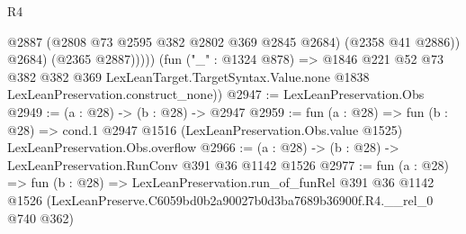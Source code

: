 \begin{lexlean}{R4}
\begin{coremodule}
                  @2887
                  (@2808 @73 @2595 @382 @2802 @369 @2845 @2684)
                  (@2358 @41 @2886))
                @2684)
              (@2365 @2887)))))
      (fun ("_" : @1324 @878) =>
      @1846
        @221
        @52
        @73
        @382
        @382
        @369
        LexLeanTarget.TargetSyntax.Value.none
        @1838
        LexLeanPreservation.construct_none))
@2947 := LexLeanPreservation.Obs
@2949 := (a : @28) -> (b : @28) -> @2947
@2959 := fun (a : @28) =>
  fun (b : @28) =>
  cond.{1} @2947 @1516 (LexLeanPreservation.Obs.value @1525) LexLeanPreservation.Obs.overflow
@2966 := (a : @28) -> (b : @28) -> LexLeanPreservation.RunConv @391 @36 @1142 @1526
@2977 := fun (a : @28) =>
  fun (b : @28) =>
  LexLeanPreservation.run_of_funRel
    @391
    @36
    @1142
    @1526
    (LexLeanPreserve.C6059bd0b2a90027b0d3ba7689b36900f.R4.__rel_0 @740 @362)
\end{coremodule}
\end{lexlean}
